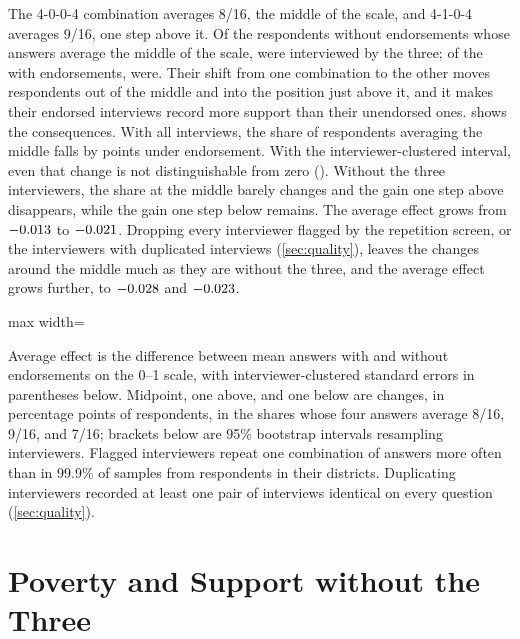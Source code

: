 \documentclass[11pt,letterpaper]{article}
\newcommand{\TableStyle}{\normalsize\setlength{\tabcolsep}{6pt}\renewcommand{\arraystretch}{1}}
\newcommand{\tablenote}[1]{\par\smallskip\begin{minipage}{\linewidth}\footnotesize #1\end{minipage}}
\begin{document}
The 4-0-0-4 combination averages 8/16, the middle of the scale, and 4-1-0-4 averages 9/16, one step above it. Of the \MidpointCountControl{} respondents without endorsements whose answers average the middle of the scale, \MidpointCountSuspect{} were interviewed by the three; of the \MidpointCountEndorsed{} with endorsements, \MidpointCountEndorsedSuspect{} were. Their shift from one combination to the other moves respondents out of the middle and into the position just above it, and it makes their endorsed interviews record more support than their unendorsed ones.  shows the consequences. With all interviews, the share of respondents averaging the middle falls by \FullMidpointDrop{} points under endorsement. With the interviewer-clustered interval, even that change is not distinguishable from zero (\FullMidpointChange{}). Without the three interviewers, the share at the middle barely changes and the gain one step above disappears, while the gain one step below remains. The average effect grows from $-0.013{}$ to $-0.021{}$. Dropping every interviewer flagged by the repetition screen, or the interviewers with duplicated interviews (\cref{sec:quality}), leaves the changes around the middle much as they are without the three, and the average effect grows further, to $-0.028{}$ and $-0.023{}$.

\begin{table}[htbp]
\centering\TableStyle
\caption{The average effect and the middle of the scale, with and without the three interviewers}
\label{tab:interviewer_samples}
\begin{adjustbox}{max width=\linewidth}

\end{adjustbox}
\tablenote{Average effect is the difference between mean answers with and without endorsements on the 0--1 scale, with interviewer-clustered standard errors in parentheses below. Midpoint, one above, and one below are changes, in percentage points of respondents, in the shares whose four answers average 8/16, 9/16, and 7/16; brackets below are 95\% bootstrap intervals resampling interviewers. Flagged interviewers repeat one combination of answers more often than in 99.9\% of samples from respondents in their districts. Duplicating interviewers recorded at least one pair of interviews identical on every question (\cref{sec:quality}).}
\end{table}

\section{Poverty and Support without the Three}
\label{sec:poverty}
\end{document}
